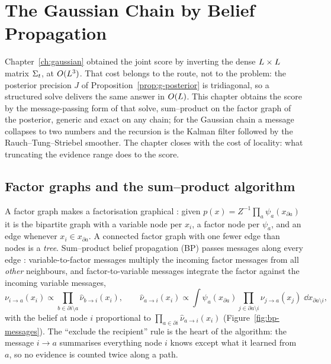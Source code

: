 %

\chapter{The Gaussian Chain by Belief Propagation}
\label{ch:gaussian-bp}\label{ch:graphs}\label{ch:graphical}

Chapter~\ref{ch:gaussian} obtained the joint score by inverting the dense
$L\times L$ matrix $\Sigma_t$, at $O(L^3)$. That cost belongs
to the route, not to the problem: the posterior precision $J$ of
Proposition~\ref{prop:g-posterior} is tridiagonal, so a structured solve
delivers the same answer in $O(L)$. This chapter obtains the score by
the message-passing form of that solve, sum--product on the factor graph of
the posterior, generic and exact on any chain; for the Gaussian chain a
message collapses to two numbers and the recursion is the Kalman filter
followed by the Rauch--Tung--Striebel smoother. The chapter closes with the
cost of locality: what truncating the evidence range does to the score.

\section{Factor graphs and the sum--product algorithm}
\label{sec:factor-graphs}\label{sec:sum-product}\label{sec:mrf}

A factor graph makes a factorisation graphical
\citep{kschischang2001factor}: given $p(x) = Z^{-1}\prod_a \psi_a(x_{\partial a})$
it is the bipartite graph with a variable node per $x_i$, a factor node per
$\psi_a$, and an edge whenever $x_i \in x_{\partial a}$. A connected factor
graph with one fewer edge than nodes is a \emph{tree}. Sum--product belief
propagation (BP) passes messages along every edge
\citep{pearl1988probabilistic, mezard2009information}: variable-to-factor
messages multiply the incoming factor messages from all \emph{other}
neighbours, and factor-to-variable messages integrate the factor against the
incoming variable messages,
\begin{equation}
  \nu_{i \to a}(x_i) \propto
    \prod_{b \in \partial i \setminus a} \hat\nu_{b \to i}(x_i),
  \qquad
  \hat\nu_{a \to i}(x_i) \propto
    \int \psi_a(x_{\partial a})
    \prod_{j \in \partial a \setminus i} \nu_{j \to a}(x_j)\;
    \dd x_{\partial a \setminus i},
  \label{eq:bp-rules}
\end{equation}
with the belief at node $i$ proportional to $\prod_{a \in \partial i}
\hat\nu_{a \to i}(x_i)$ (Figure~\ref{fig:bp-messages}). The ``exclude the
recipient'' rule is the heart of the algorithm: the message $i \to a$
summarises everything node $i$ knows except what it learned from $a$, so no
evidence is counted twice along a path.

